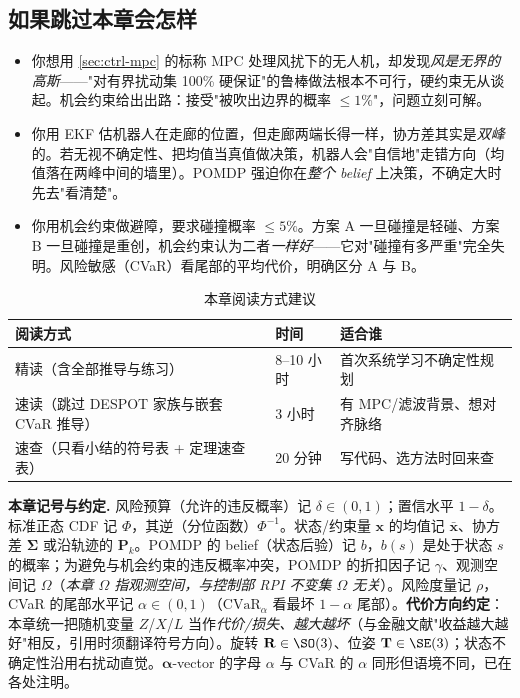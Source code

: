 \subsection*{如果跳过本章会怎样}
\begin{itemize}
  \item 你想用 \cref{sec:ctrl-mpc} 的标称 MPC 处理风扰下的无人机，却发现\emph{风是无界的高斯}——"对有界扰动集 100\% 硬保证"的鲁棒做法根本不可行，硬约束无从谈起。机会约束给出出路：接受"被吹出边界的概率 $\le 1\%$"，问题立刻可解。
  \item 你用 EKF 估机器人在走廊的位置，但走廊两端长得一样，协方差其实是\emph{双峰}的。若无视不确定性、把均值当真值做决策，机器人会"自信地"走错方向（均值落在两峰中间的墙里）。POMDP 强迫你在\emph{整个 belief} 上决策，不确定大时先去"看清楚"。
  \item 你用机会约束做避障，要求碰撞概率 $\le5\%$。方案 A 一旦碰撞是轻碰、方案 B 一旦碰撞是重创，机会约束认为二者\emph{一样好}——它对"碰撞有多严重"完全失明。风险敏感（CVaR）看尾部的平均代价，明确区分 A 与 B。
\end{itemize}

\begin{table}[H]\centering\small
\caption{本章阅读方式建议}
\label{tab:plan-chance-reading}
\begin{tabular}{lll}
\toprule
阅读方式 & 时间 & 适合谁 \\
\midrule
精读（含全部推导与练习） & 8--10 小时 & 首次系统学习不确定性规划 \\
速读（跳过 DESPOT 家族与嵌套 CVaR 推导） & 3 小时 & 有 MPC/滤波背景、想对齐脉络 \\
速查（只看小结的符号表 + 定理速查表） & 20 分钟 & 写代码、选方法时回来查 \\
\bottomrule
\end{tabular}
\end{table}

\begin{note}
\textbf{本章记号与约定.}\;
风险预算（允许的违反概率）记 $\delta\in(0,1)$；置信水平 $1-\delta$。标准正态 CDF 记 $\Phi$，其逆（分位函数）$\Phi^{-1}$。状态/约束量 $\mathbf{x}$ 的均值记 $\bar{\mathbf{x}}$、协方差 $\boldsymbol{\Sigma}$ 或沿轨迹的 $\mathbf{P}_k$。POMDP 的 belief（状态后验）记 $b$，$b(s)$ 是处于状态 $s$ 的概率；为避免与机会约束的违反概率冲突，POMDP 的折扣因子记 $\gamma$、观测空间记 $\Omega$（\emph{本章 $\Omega$ 指观测空间，与控制部 RPI 不变集 $\Omega$ 无关}）。风险度量记 $\rho$，CVaR 的尾部水平记 $\alpha\in(0,1)$（$\mathrm{CVaR}_\alpha$ 看最坏 $1-\alpha$ 尾部）。\textbf{代价方向约定}：本章统一把随机变量 $Z$/$X$/$L$ 当作\emph{代价/损失、越大越坏}（与金融文献"收益越大越好"相反，引用时须翻译符号方向）。旋转 $\mathbf{R}\in\SO(3)$、位姿 $\mathbf{T}\in\SE(3)$；状态不确定性沿用右扰动直觉。$\boldsymbol{\alpha}$-vector 的字母 $\alpha$ 与 CVaR 的 $\alpha$ 同形但语境不同，已在各处注明。
\end{note}

